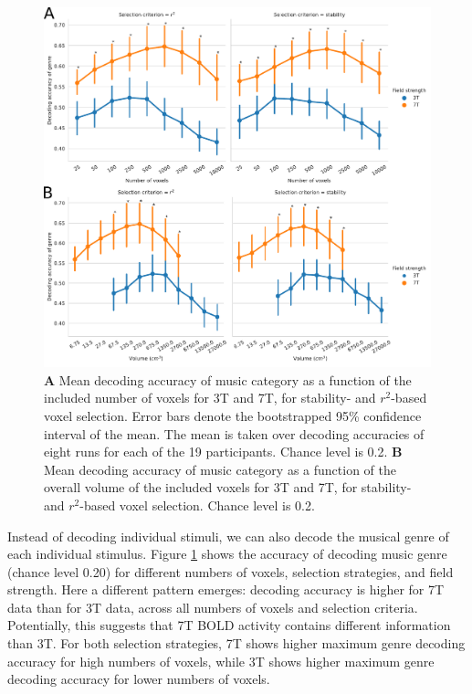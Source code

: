 \begin{figure}[!htb]
  \centering
  \includegraphics[width=\linewidth]{pics/decoding_genre.pdf}

  \caption{\textbf{A} Mean decoding accuracy of music category as a function of
  the included number of voxels for 3T and 7T, for stability- and
  $r^2$-based voxel selection. Error bars denote the bootstrapped 95\%
  confidence interval of the mean. The mean is taken over decoding
  accuracies of eight runs for each of the 19 participants. Chance level is 0.2. \textbf{B} Mean
decoding accuracy of music category as a function of the overall volume of the
included voxels for 3T and 7T, for stability- and $r^2$-based voxel
selection. Chance level is 0.2.
}

 \label{fig:decoding_accuracy}
\end{figure}

Instead of decoding individual stimuli, we can also decode the musical genre of each individual stimulus. Figure \ref{fig:decoding_accuracy} shows the accuracy of decoding music genre (chance level 0.20) for different numbers of voxels, selection strategies, and field strength. Here a different pattern emerges: decoding accuracy is higher for 7T data than for 3T data, across all numbers of voxels and selection criteria. Potentially, this suggests that 7T BOLD activity contains different information than 3T.  For both selection strategies, 7T shows higher maximum genre decoding accuracy for high numbers of voxels, while 3T shows higher maximum genre decoding accuracy for lower numbers of voxels.

